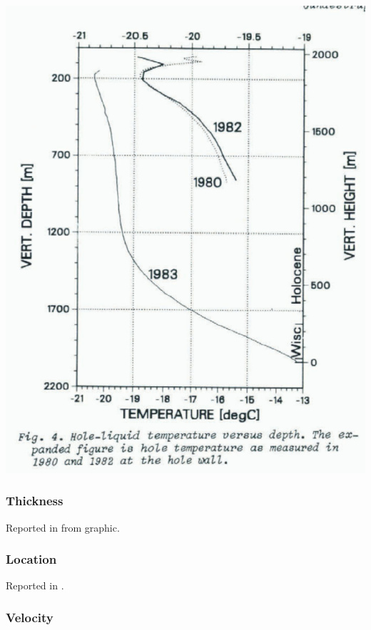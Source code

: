 \documentclass[article,a4paper,times,11pt,twoside]{article}
\begin{document}
\begin{center}
\includegraphics[width=.9\linewidth]{dye_3/gundestrup_1984_fig4.png}
\end{center}

\subsubsection{Thickness}
\label{sec:org71544f4}

Reported in \textcite{gundestrup_1984} from graphic.

\subsubsection{Location}
\label{sec:org25290f6}

Reported in \textcite{gundestrup_1984}.

\subsubsection{Velocity}
\label{sec:org818ad35}
\clearpage
\end{document}
